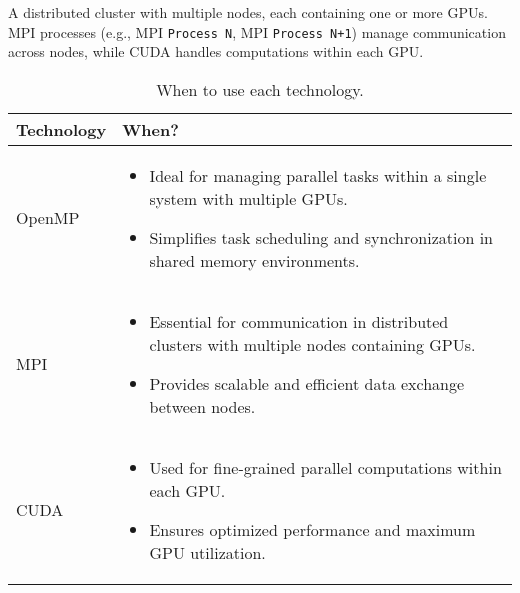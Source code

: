 \highspace
\begin{examplebox}
  A distributed cluster with multiple nodes, each containing one or more GPUs. MPI processes (e.g., MPI \texttt{Process N}, MPI \texttt{Process N+1}) manage communication across nodes, while CUDA handles computations within each GPU.
\end{examplebox}

\newpage

\begin{table}[!htp]
  \centering
  \begin{tabular}{@{} l p{25em} @{}}
    \toprule
    \textbf{Technology} & \textbf{When?} \\
    \midrule
    OpenMP  & \begin{itemize}
      \item Ideal for managing parallel tasks within a single system with multiple GPUs.
      \item Simplifies task scheduling and synchronization in shared memory environments.
    \end{itemize} \\
    MPI     & \begin{itemize}
      \item Essential for communication in distributed clusters with multiple nodes containing GPUs.
      \item Provides scalable and efficient data exchange between nodes.
    \end{itemize} \\
    CUDA    & \begin{itemize}
      \item Used for fine-grained parallel computations within each GPU.
      \item Ensures optimized performance and maximum GPU utilization.
    \end{itemize} \\
    \bottomrule
  \end{tabular}
  \caption{When to use each technology.}
\end{table}


